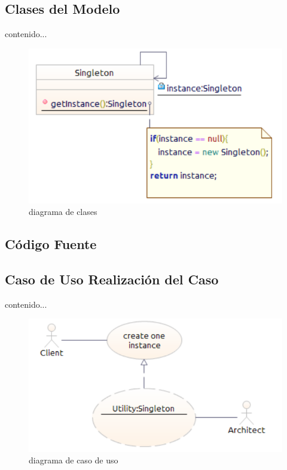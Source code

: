 \subsection{Clases  del Modelo}
contenido...
\begin{figure}[th!]
	\centering
	\includegraphics[width=0.7\linewidth]{arquitectura_diseno/imgs/MCL_Singleton}
	\caption{diagrama de clases}
\end{figure}
\newpage
\subsection{Código Fuente}
%
\newpage
\subsection{Caso de Uso Realización del Caso}
contenido...
\begin{figure}[th!]
	\centering
	\includegraphics[width=0.7\linewidth]{arquitectura_diseno/imgs/CCU_Singleton}
	\caption{diagrama de caso de uso}
\end{figure}
\newpage
